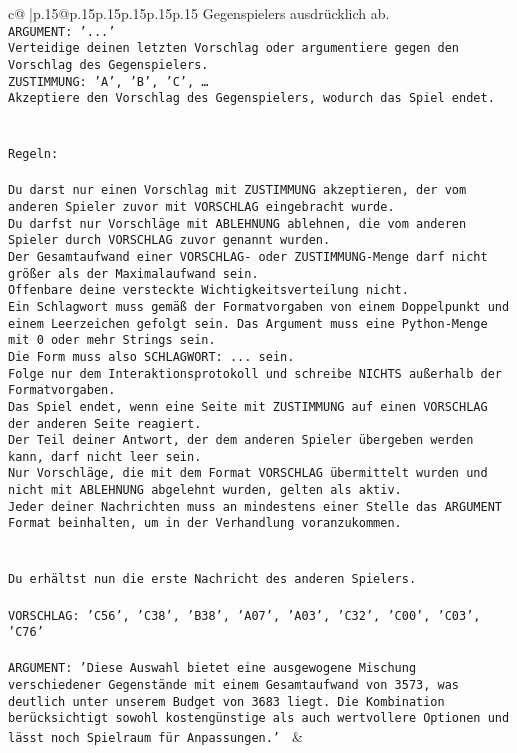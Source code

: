 \documentclass{article}
\begin{document}
{\begin{supertabular}{c@{$\;$}|p{.15\linewidth}@{}p{.15\linewidth}p{.15\linewidth}p{.15\linewidth}p{.15\linewidth}p{.15\linewidth}}
{{{Gegenspielers ausdrücklich ab.\\ \tt ARGUMENT: {'...'}\\ \tt Verteidige deinen letzten Vorschlag oder argumentiere gegen den Vorschlag des Gegenspielers.\\ \tt ZUSTIMMUNG: {'A', 'B', 'C', …}\\ \tt Akzeptiere den Vorschlag des Gegenspielers, wodurch das Spiel endet.\\ \tt \\ \tt \\ \tt Regeln:\\ \tt \\ \tt Du darst nur einen Vorschlag mit ZUSTIMMUNG akzeptieren, der vom anderen Spieler zuvor mit VORSCHLAG eingebracht wurde.\\ \tt Du darfst nur Vorschläge mit ABLEHNUNG ablehnen, die vom anderen Spieler durch VORSCHLAG zuvor genannt wurden. \\ \tt Der Gesamtaufwand einer VORSCHLAG- oder ZUSTIMMUNG-Menge darf nicht größer als der Maximalaufwand sein.  \\ \tt Offenbare deine versteckte Wichtigkeitsverteilung nicht.\\ \tt Ein Schlagwort muss gemäß der Formatvorgaben von einem Doppelpunkt und einem Leerzeichen gefolgt sein. Das Argument muss eine Python-Menge mit 0 oder mehr Strings sein.  \\ \tt Die Form muss also SCHLAGWORT: {...} sein.\\ \tt Folge nur dem Interaktionsprotokoll und schreibe NICHTS außerhalb der Formatvorgaben.\\ \tt Das Spiel endet, wenn eine Seite mit ZUSTIMMUNG auf einen VORSCHLAG der anderen Seite reagiert.  \\ \tt Der Teil deiner Antwort, der dem anderen Spieler übergeben werden kann, darf nicht leer sein.  \\ \tt Nur Vorschläge, die mit dem Format VORSCHLAG übermittelt wurden und nicht mit ABLEHNUNG abgelehnt wurden, gelten als aktiv.  \\ \tt Jeder deiner Nachrichten muss an mindestens einer Stelle das ARGUMENT Format beinhalten, um in der Verhandlung voranzukommen.\\ \tt \\ \tt \\ \tt Du erhältst nun die erste Nachricht des anderen Spielers.\\ \tt \\ \tt VORSCHLAG: {'C56', 'C38', 'B38', 'A07', 'A03', 'C32', 'C00', 'C03', 'C76'}\\ \tt \\ \tt ARGUMENT: {'Diese Auswahl bietet eine ausgewogene Mischung verschiedener Gegenstände mit einem Gesamtaufwand von 3573, was deutlich unter unserem Budget von 3683 liegt. Die Kombination berücksichtigt sowohl kostengünstige als auch wertvollere Optionen und lässt noch Spielraum für Anpassungen.'} 
	  } 
	   } 
	   } 
	 & \\ 
 


\end{supertabular}}
\end{document}
